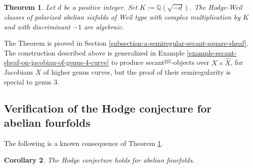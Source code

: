 \documentclass[12pt]{amsart}
\numberwithin{equation}{subsection}
\theoremstyle{plain}
\newtheorem{thm}{Theorem}[subsection]
\newtheorem{cor}[thm]{Corollary}
\theoremstyle{definition}
\newcommand{\E}{{\mathcal E}}
\newcommand{\QQ}{{\mathbb Q}}
\begin{document}
\begin{thm}
\label{thm-algebraicity}
Let $d$ be a positive integer. Set $K:=\QQ(\sqrt{-d})$. The Hodge-Weil classes of 
polarized abelian sixfolds of Weil type with complex multiplication by $K$ and with discriminant $-1$ are algebraic.
\end{thm}

The Theorem is proved in Section \ref{subsection-a-semiregular-secant-square-sheaf}.
The construction described above is generalized in Example \ref{example-secant-sheaf-on-jacobian-of-genus-4-curve}
to produce secant$^{\boxtimes 2}$-objects over $X\times\hat{X}$, for Jacobians $X$ of higher genus curves, but the proof of their semiregularity is special to genus $3$.

% 
\subsection{Verification of the Hodge conjecture for abelian fourfolds}
The following is a known consequence of Theorem \ref{thm-algebraicity}. 

\begin{cor}
The Hodge conjecture holds for abelian fourfolds.
\end{cor}
\end{document}
